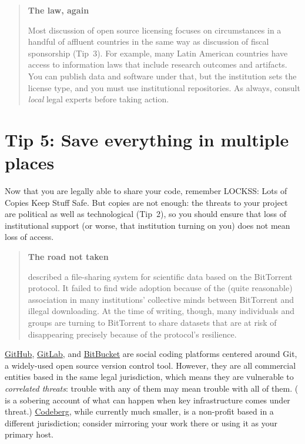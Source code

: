 \documentclass[10pt,letterpaper]{article}
\begin{document}
\begin{quote}
  \noindent
  \textbf{The law, again}

  Most discussion of open source licensing focuses on circumstances in a handful of affluent countries
  in the same way as discussion of fiscal sponsorship (Tip~3).
  For example,
  many Latin American countries have access to information laws that include research outcomes and artifacts.
  You can publish data and software under that,
  but the institution sets the license type,
  and you must use institutional repositories.
  As always,
  consult \emph{local} legal experts before taking action.
\end{quote}

\section*{Tip 5: Save everything in multiple places}

Now that you are legally able to share your code, remember LOCKSS: Lots of Copies Keep Stuff Safe.
But copies are not enough:
the threats to your project are political as well as technological (Tip~2),
so you should ensure that loss of institutional support
(or worse, that institution turning on you)
does not mean loss of access.

\begin{quote}
  \noindent
  \textbf{The road not taken}

  \cite{Langille2010} described a file-sharing system for scientific data
  based on the BitTorrent protocol.
  It failed to find wide adoption because of the (quite reasonable) association in many institutions' collective minds
  between BitTorrent and illegal downloading.
  At the time of writing,
  though,
  many individuals and groups are turning to BitTorrent to share datasets that are at risk of disappearing
  precisely because of the protocol's resilience.
\end{quote}

\href{https://github.com/}{GitHub},
\href{https://gitlab.com}{GitLab},
and \href{https://bitbucket.org/}{BitBucket}
are social coding platforms centered around Git,
a widely-used open source version control tool.
However,
they are all commercial entities based in the same legal jurisdiction,
which means they are vulnerable to \emph{correlated threats}:
trouble with any of them may mean trouble with all of them.
(\cite{Tamburri2020} is a sobering account of what can happen when key infrastructure comes under threat.)
\href{https://codeberg.org/}{Codeberg},
while currently much smaller,
is a non-profit based in a different jurisdiction;
consider mirroring your work there or using it as your primary host.
\end{document}

